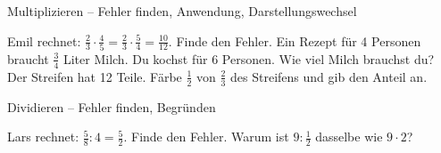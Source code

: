\begin{aufgabe}{Multiplizieren – Fehler finden, Anwendung, Darstellungswechsel}
\begin{teile}
\teil Emil rechnet: $\frac{2}{3} \cdot \frac{4}{5} = \frac{2}{3} \cdot \frac{5}{4} = \frac{10}{12}$. Finde den Fehler.
\teil Ein Rezept für 4 Personen braucht $\frac{3}{4}$ Liter Milch. Du kochst für 6 Personen. Wie viel Milch brauchst du?
\teil Der Streifen hat 12 Teile. Färbe $\frac{1}{2}$ von $\frac{2}{3}$ des Streifens und gib den Anteil an.

\leerfeld
\end{teile}
\end{aufgabe}

\begin{aufgabe}{Dividieren – Fehler finden, Begründen}
\begin{teile}
\teil Lars rechnet: $\frac{5}{8} : 4 = \frac{5}{2}$. Finde den Fehler.
\teil Warum ist $9 : \frac{1}{2}$ dasselbe wie $9 \cdot 2$?
\end{teile}
\end{aufgabe}
